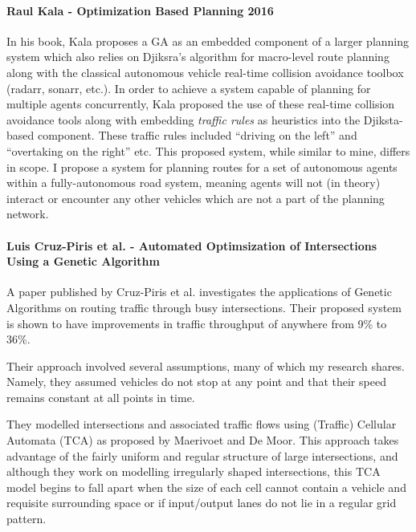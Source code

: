 \paragraph{Raul Kala - Optimization Based Planning 2016\cite{kalaOptimizationBasedPlanning2016}}
In his book, Kala proposes a GA as an embedded component of a larger planning system which also relies on Djiksra's algorithm for macro-level route planning along with the classical autonomous vehicle real-time collision avoidance toolbox (radarr, sonarr, etc.). In order to achieve a system capable of planning for multiple agents concurrently, Kala proposed the use of these real-time collision avoidance tools along with embedding \textit{traffic rules} as heuristics into the Djiksta-based component. These traffic rules included ``driving on the left'' and ``overtaking on the right'' etc. This proposed system, while similar to mine, differs in scope. I propose a system for planning routes for a set of autonomous agents within a fully-autonomous road system, meaning agents will not (in theory) interact or encounter any other vehicles which are not a part of the planning network.

\paragraph{Luis Cruz-Piris et al. - Automated Optimsization of Intersections Using a Genetic Algorithm\cite{cruz-pirisAutomatedOptimizationIntersections2019}}
A paper published by Cruz-Piris et al. investigates the applications of Genetic Algorithms on routing traffic through busy intersections. Their proposed system is shown to have improvements in traffic throughput of anywhere from 9\% to 36\%.

Their approach involved several assumptions, many of which my research shares. Namely, they assumed vehicles do not stop at any point and that their speed remains constant at all points in time.

They modelled intersections and associated traffic flows using (Traffic) Cellular Automata (TCA) as proposed by Maerivoet and De Moor\cite{maerivoetCellularAutomataModels2005}. This approach takes advantage of the fairly uniform and regular structure of large intersections, and although they work on modelling irregularly shaped intersections, this TCA model begins to fall apart when the size of each cell cannot contain a vehicle and requisite surrounding space or if input/output lanes do not lie in a regular grid pattern.

